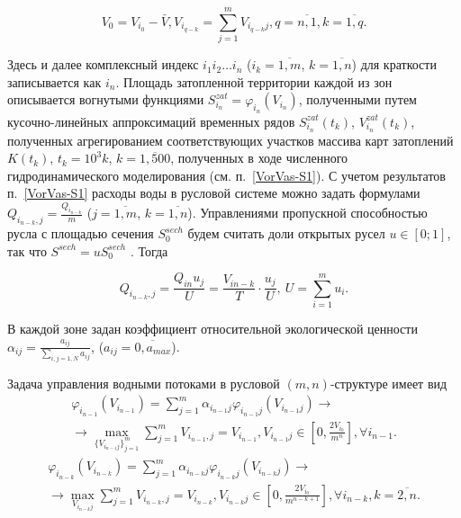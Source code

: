  \begin{equation*}
 V_0=V_{i_{0}}-\bar{V}, V_{i_{q-k}}=\sum\limits_{j=1}^m V_{i_{q-k}j}, q=\overline{n,1},k=\overline{1,q}.
\end{equation*}

Здесь и далее комплексный индекс $i_1 i_2 \ldots i_n$ ($i_k=\overline{1,m}$, $k=\overline{1,n}$)  для краткости записывается как  $i_n$. Площадь затопленной территории каждой из зон описывается вогнутыми функциями $S^{zat}_{i_n}=\varphi_{i_n} (V_{i_n})$, полученными путем кусочно-линейных аппроксимаций временных  рядов $S^{zat}_{i_n} (t_k)$,
$V^{zat}_{i_n} (t_k)$, полученных агрегированием соответствующих участков массива карт затоплений $K(t_k)$, $t_k=10^3 k$, $k=\overline{1,500}$, полученных в ходе численного гидродинамического моделирования (см. п.~\ref{VorVas-S1}). С учетом результатов п.~\ref{VorVas-S1} расходы воды в русловой системе можно задать формулами  $Q_{i_{n-k},j}=\frac{Q_{i_{n-k}}}{m}$  ($j=\overline{1,m}$, $k=\overline{1,n}$). Управлениями пропускной способностью русла с площадью сечения $S^{sech}_0$ будем считать доли открытых русел $u\in [0;1]$, так что $S^{sech}=u S^{sech}_0$ . Тогда

  \begin{equation*}
    Q_{i_{n-k},j}=\frac{Q_{in}u_j}{U}=\frac{V_{in-k}}{T}\cdot\frac{u_j}{U},\ U=\sum\limits_{i=1}^m u_i.
  \end{equation*}

В каждой зоне задан коэффициент относительной экологической ценности $\alpha_{ij}=\frac{a_{ij}}{\sum\limits_{i,j=\overline{1,N}} a_{ij}}$, ($a_{ij}=\overline{0,a_{max}}$).

Задача управления водными потоками в русловой  $(m,n)$-структуре имеет вид
\begin{multline}\label{eq:vorvas-maxn}
\varphi_{i_{n-1}}(V_{i_{n-1}})=\sum\limits_{j=1}^m \alpha_{i_{n-1}j}\varphi_{i_{n-1}j}(V_{i_{n-1}j})\to \\
\to \max\limits_{\{V_{i_{n-1}j}\}_{j=1}^m} \sum\limits_{j=1}^m V_{i_{n-1},j}=V_{i_{n-1}}, V_{i_{n-1}j} \in\left[0, \frac{2V_{i_0}}{m^{n}}\right], \forall i_{n-1}.
\end{multline}
\begin{multline}\label{eq:vorvas-maxk}
\varphi_{i_{n-k}}(V_{i_{n-k}})=\sum\limits_{j=1}^m \alpha_{i_{n-k}j}\varphi_{i_{n-k}j}(V_{i_{n-k}j})\to  \\
\to \max\limits_{V_{i_{n-k}j}}  \sum\limits_{j=1}^m V_{i_{n-k},j}=V_{i_{n-k}}, V_{i_{n-k}j} \in\left[0, \frac{2V_{i_0}}{m^{n-k+1}}\right], \forall i_{n-k},k=\overline{2,n}.
\end{multline}


